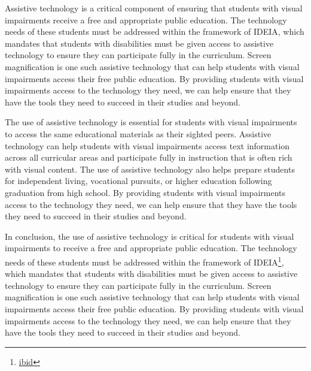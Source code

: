 \documentclass[14pt,letterpaper,twoside]{extreport}
\begin{document}
Assistive technology is a critical component of ensuring that students with visual impairments receive a free and appropriate public education. The technology needs of these students must be addressed within the framework of IDEIA, which mandates that students with disabilities must be given access to assistive technology to ensure they can participate fully in the curriculum. Screen magnification is one such assistive technology that can help students with visual impairments access their free public education. By providing students with visual impairments access to the technology they need, we can help ensure that they have the tools they need to succeed in their studies and beyond.

The use of assistive technology is essential for students with visual impairments to access the same educational materials as their sighted peers. Assistive technology can help students with visual impairments access text information across all curricular areas and participate fully in instruction that is often rich with visual content. The use of assistive technology also helps prepare students for independent living, vocational pursuits, or higher education following graduation from high school. By providing students with visual impairments access to the technology they need, we can help ensure that they have the tools they need to succeed in their studies and beyond.

In conclusion, the use of assistive technology is critical for students with visual impairments to receive a free and appropriate public education. The technology needs of these students must be addressed within the framework of IDEIA\footnote{\href{https://sites.ed.gov/idea/statuteregulations/}{ibid}}, which mandates that students with disabilities must be given access to assistive technology to ensure they can participate fully in the curriculum. Screen magnification is one such assistive technology that can help students with visual impairments access their free public education. By providing students with visual impairments access to the technology they need, we can help ensure that they have the tools they need to succeed in their studies and beyond.
\end{document}
